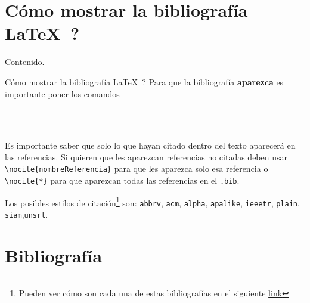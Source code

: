 \documentclass[dvipsnames,xcolor=x11names]{beamer}
\theoremstyle{plain}
\theoremstyle{definition}
\begin{document}
\section{\textquestiondown Cómo mostrar la bibliografía \LaTeX\ ?}
\begin{frame}{Contenido.}
  \tableofcontents[currentsection]
\end{frame}
\begin{frame}[fragile]{\textquestiondown Cómo mostrar la bibliografía \LaTeX\ ?}
 Para que la bibliografía \textbf{aparezca} es importante poner los comandos
 \begin{verbatim}
  
  
 \end{verbatim}
 \vspace*{-0.5cm}
 Es importante saber que solo lo que hayan citado dentro del texto aparecerá en las referencias. Si quieren que les aparezcan referencias no citadas deben usar \verb!\nocite{nombreReferencia}! para que les aparezca solo esa referencia o \verb!\nocite{*}! para que aparezcan todas las referencias en el \verb!.bib!. \pause
 
 Los posibles estilos de citación\footnote{Pueden ver cómo son cada una de estas bibliografías en el siguiente \href{https://www.overleaf.com/learn/latex/Bibtex_bibliography_styles#Further_reading}{\textcolor{colorClase}{link}}} son: \verb!abbrv!, \verb!acm!, \verb!alpha!, \verb!apalike!, \verb!ieeetr!, \verb!plain!, \verb!siam!,\verb!unsrt!.
 
 
\end{frame}


\section{Bibliografía}
\begin{frame}
      
  
\end{frame}
\end{document}
